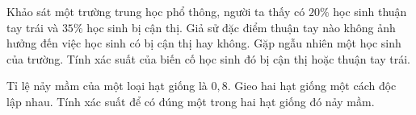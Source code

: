 
\begin{bt}%
	Khảo sát một trường trung học phổ thông, người ta thấy có $20\%$ học sinh thuận tay trái và $35\%$ học sinh bị cận thị. Giả sử đặc điểm thuận tay nào không  ảnh hưởng đến việc học sinh có bị cận thị hay không. Gặp ngẫu nhiên một học sinh của trường. Tính xác suất của biến cố học sinh đó bị cận thị hoặc thuận tay trái.
\end{bt}

\begin{bt}%
	Tỉ  lệ nảy mầm của một loại hạt giống là $0{,}8$. Gieo hai hạt giống một cách độc lập nhau. Tính xác suất để có đúng một trong hai hạt giống đó nảy mầm.
\end{bt}

